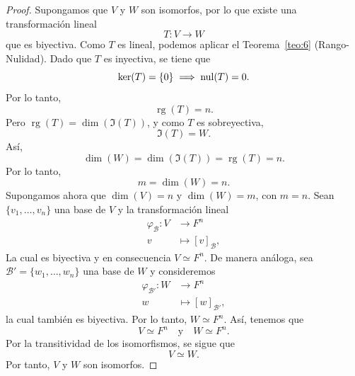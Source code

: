 \documentclass[12pt,a4paper]{book}
\newcommand{\rg}{\operatorname{rg}}
\begin{document}
    \begin{proof}
        Supongamos que $V$ y $W$ son isomorfos, por lo que existe una transformación lineal
        \begin{equation*}
            T:V \to W
        \end{equation*}
        que es biyectiva. Como $T$ es lineal, podemos aplicar el Teorema~\ref{teo:6} (Rango-Nulidad). Dado que $T$ es inyectiva, se tiene que
        \begin{equation*}
            \ker(T) = \{0\} \implies \operatorname{nul}(T) = 0.
        \end{equation*}
        Por lo tanto,
        \begin{equation*}
            \rg(T) = n.
        \end{equation*}
        Pero $\rg(T) = \dim(\Im(T))$, y como $T$ es sobreyectiva,
        \begin{equation*}
            \Im(T) = W.
        \end{equation*}
        Así,
        \begin{equation*}
            \dim(W) = \dim(\Im(T)) = \rg(T) = n.
        \end{equation*}
        Por lo tanto,
        \begin{equation*}
            m = \dim(W) = n.
        \end{equation*}
        Supongamos ahora que $\dim(V) = n$ y $\dim(W) = m$, con $m = n$.
        Sean $\{v_{1},\dots,v_{n}\}$ una base de $V$ y la transformación lineal
        \begin{align*}
            \varphi_{\mathcal{B}}:V & \to F^{n}\\
            v & \mapsto [v]_{\mathcal{B}},
        \end{align*}
        La cual es biyectiva y en consecuencia $V \simeq F^{n}$. De manera análoga, sea $\mathcal{B}' = \{w_{1},\dots,w_{n}\}$ una base de $W$ y consideremos
        \begin{align*}
            \varphi_{\mathcal{B}'}:W & \to F^{n}\\
            w & \mapsto [w]_{\mathcal{B}'},
        \end{align*}
        la cual también es biyectiva. Por lo tanto, $W \simeq F^{n}$. Así, tenemos que
        \begin{equation*}
            V \simeq F^{n} \quad \text{y} \quad W \simeq F^{n}.
        \end{equation*}
        Por la transitividad de los isomorfismos, se sigue que
        \begin{equation*}
            V \simeq W.
        \end{equation*}
        Por tanto, $V$ y $W$ son isomorfos.
    \end{proof}
    
\end{document}
